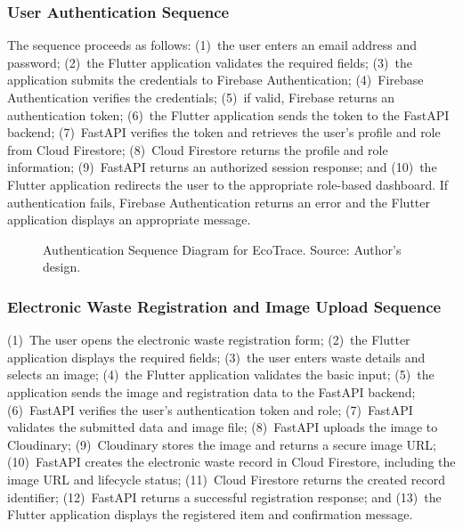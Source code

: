 \subsubsection{User Authentication Sequence}
The sequence proceeds as follows: (1)~the user enters an email address and
password; (2)~the Flutter application validates the required fields; (3)~the
application submits the credentials to Firebase Authentication; (4)~Firebase
Authentication verifies the credentials; (5)~if valid, Firebase returns an
authentication token; (6)~the Flutter application sends the token to the
FastAPI backend; (7)~FastAPI verifies the token and retrieves the user's
profile and role from Cloud Firestore; (8)~Cloud Firestore returns the profile
and role information; (9)~FastAPI returns an authorized session response; and
(10)~the Flutter application redirects the user to the appropriate role-based
dashboard. If authentication fails, Firebase Authentication returns an error
and the Flutter application displays an appropriate message.

\begin{figure}[H]
  \centering
  \caption{Authentication Sequence Diagram for EcoTrace. Source: Author's design.}
  \label{fig:seq-auth}
\end{figure}

\subsubsection{Electronic Waste Registration and Image Upload Sequence}
(1)~The user opens the electronic waste registration form; (2)~the Flutter
application displays the required fields; (3)~the user enters waste details and
selects an image; (4)~the Flutter application validates the basic input; (5)~the
application sends the image and registration data to the FastAPI backend;
(6)~FastAPI verifies the user's authentication token and role; (7)~FastAPI
validates the submitted data and image file; (8)~FastAPI uploads the image to
Cloudinary; (9)~Cloudinary stores the image and returns a secure image URL;
(10)~FastAPI creates the electronic waste record in Cloud Firestore, including
the image URL and lifecycle status; (11)~Cloud Firestore returns the created
record identifier; (12)~FastAPI returns a successful registration response; and
(13)~the Flutter application displays the registered item and confirmation
message.

